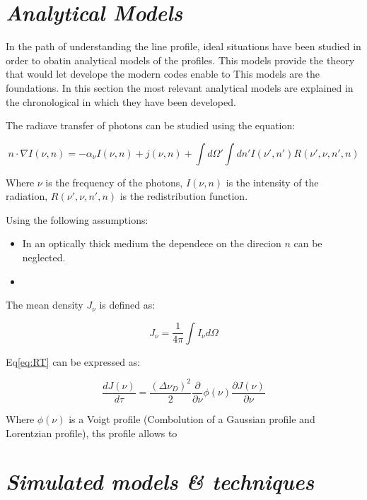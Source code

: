 \section{\emph{Analytical Models}}\label{sec:analytic}

In the path of understanding the \ly line profile, ideal 
situations have been studied in order to obatin analytical 
models of the profiles. This models provide the theory that
would let develope the modern codes enable to 
This models are the foundations. In this section the most relevant 
analytical models are explained in the chronological in which 
they have been developed. 

The radiave transfer of \ly photons can be studied using the equation:
 
\begin{equation}\label{eq:RT}
n\cdot\nabla I(\nu, n)= - \alpha_{\nu} I(\nu, n) + j(\nu, n) + \int d\Omega' \int dn' I(\nu', n') R(\nu', \nu, n', n)
\end{equation}

Where $\nu$ is the frequency of the \ly photons, $I(\nu, n)$ is the intensity
of the radiation, $R(\nu', \nu, n', n)$ is the redistribution function.

Using the following assumptions:

\begin{itemize}
\item In an optically thick medium the dependece on the direcion {\bf{$n$}} can 
be neglected.

\item 
\end{itemize}

The mean density $J_{\nu}$ is defined as:

\begin{equation}
J_{\nu} = \dfrac{1}{4\pi}\int I_{\nu}d\Omega
\end{equation}

Eq\ref{eq:RT} can be expressed as: 

\begin{equation}
\dfrac{dJ(\nu)}{d\tau} = \dfrac{(\Delta \nu_D)^2}{2}\dfrac{\partial}{\partial \nu}\phi(\nu)\dfrac{\partial J(\nu)}{\partial \nu}
\end{equation}

Where $\phi(\nu)$ is a Voigt profile (Combolution of a Gaussian profile  and Lorentzian profile), ths profile allows to 

\section{\emph{Simulated models \& techniques}}

